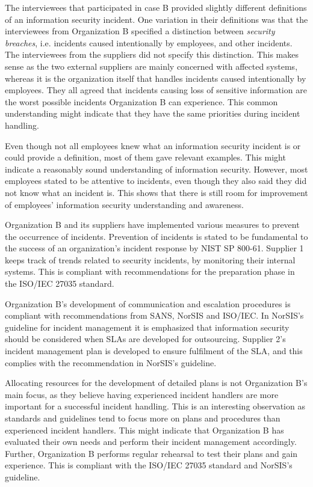 The interviewees that participated in case B provided slightly different definitions of an information security incident. One variation in their definitions was that the interviewees from Organization B specified a distinction between \textit{security breaches}, i.e. incidents caused intentionally by employees, and other incidents. The interviewees from the suppliers did not specify this distinction. This makes sense as the two external suppliers are mainly concerned with affected systems, whereas it is the organization itself that handles incidents caused intentionally by employees. They all agreed that incidents causing loss of sensitive information are the worst possible incidents Organization B can experience. This common understanding might indicate that they have the same priorities during incident handling.

Even though not all employees knew what an information security incident is or could provide a definition, most of them gave relevant examples. This might indicate a reasonably sound understanding of information security. However, most employees stated to be attentive to incidents, even though they also said they did not know what an incident is. This shows that there is still room for improvement of employees' information security understanding and awareness.

Organization B and its suppliers have implemented various measures to prevent the occurrence of incidents. Prevention of incidents is stated to be fundamental to the success of an organization's incident response by NIST SP 800-61. Supplier 1 keeps track of trends related to security incidents, by monitoring their internal systems. This is compliant with recommendations for the preparation phase in the ISO/IEC 27035 standard.

Organization B's development of communication and escalation procedures is compliant with recommendations from SANS, NorSIS and ISO/IEC. In NorSIS's guideline for incident management it is emphasized that information security should be considered when \acp{SLA} are developed for outsourcing. Supplier 2's incident management plan is developed to ensure fulfilment of the \ac{SLA}, and this complies with the recommendation in NorSIS's guideline. 

Allocating resources for the development of detailed plans is not Organization B's main focus, as they believe having experienced incident handlers are more important for a successful incident handling. This is an interesting observation as standards and guidelines tend to focus more on plans and procedures than experienced incident handlers. This might indicate that Organization B has evaluated their own needs and perform their incident management accordingly. Further, Organization B performs regular rehearsal to test their plans and gain experience. This is compliant with the ISO/IEC 27035 standard and NorSIS's guideline. 

